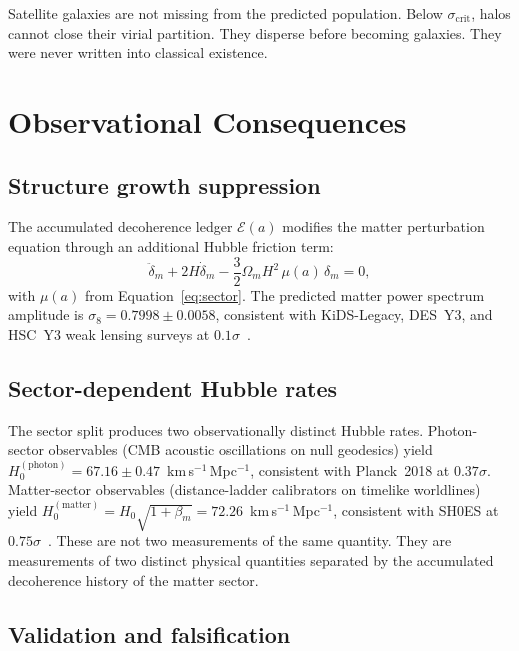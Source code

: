 \documentclass[12pt,a4paper]{article}
\begin{document}
Satellite galaxies are not missing from the predicted population. Below
$\sigma_\mathrm{crit}$, halos cannot close their virial partition. They
disperse before becoming galaxies. They were never written into classical
existence.

\section{Observational Consequences}
\label{sec:obs}

\subsection{Structure growth suppression}

The accumulated decoherence ledger $\mathcal{E}(a)$ modifies the matter
perturbation equation through an additional Hubble friction term:
\begin{equation}
\ddot{\delta}_m + 2H\dot{\delta}_m
- \frac{3}{2}\Omega_m H^2\,\mu(a)\,\delta_m = 0,
\end{equation}
with $\mu(a)$ from Equation~\ref{eq:sector}. The predicted matter power
spectrum amplitude is $\sigma_8 = 0.7998 \pm 0.0058$, consistent with
KiDS-Legacy, DES~Y3, and HSC~Y3 weak lensing surveys at
$0.1\sigma$~\citep{IAM_obs}.

\subsection{Sector-dependent Hubble rates}

The sector split produces two observationally distinct Hubble rates.
Photon-sector observables (CMB acoustic oscillations on null geodesics)
yield $H_0^\mathrm{(photon)} = 67.16 \pm 0.47$~km\,s$^{-1}$\,Mpc$^{-1}$,
consistent with Planck~2018 at $0.37\sigma$. Matter-sector observables
(distance-ladder calibrators on timelike worldlines) yield
$H_0^\mathrm{(matter)} = H_0\sqrt{1+\beta_m} = 72.26$~km\,s$^{-1}$\,Mpc$^{-1}$,
consistent with SH0ES at $0.75\sigma$~\citep{IAM_obs}. These are not
two measurements of the same quantity. They are measurements of two
distinct physical quantities separated by the accumulated decoherence
history of the matter sector.

\subsection{Validation and falsification}
\end{document}
